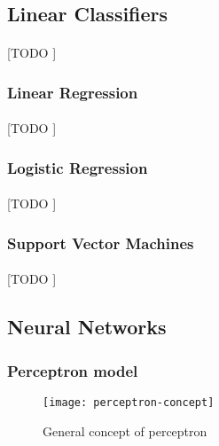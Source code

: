 \documentclass{article}
\begin{document}
		\subsection{Linear Classifiers}
		\label{sec:decision-trees}

			\paragraph{}
			[TODO ]

			\subsubsection{Linear Regression}
			\label{sec:linear-regression}

				\paragraph{}
				[TODO ]

			\subsubsection{Logistic Regression}
			\label{sec:logistic-regression}

				\paragraph{}
				[TODO ]

			\subsubsection{Support Vector Machines}
			\label{sec:svm}

				\paragraph{}
				[TODO ]


		\subsection{Neural Networks}
		\label{sec:neural-networks}

			\subsubsection{Perceptron model}

			\begin{figure}
				\centering
				\texttt{[image: perceptron-concept]}
				\caption{General concept of perceptron}
				\label{fig:perceptron-concept}
			\end{figure}
\end{document}
